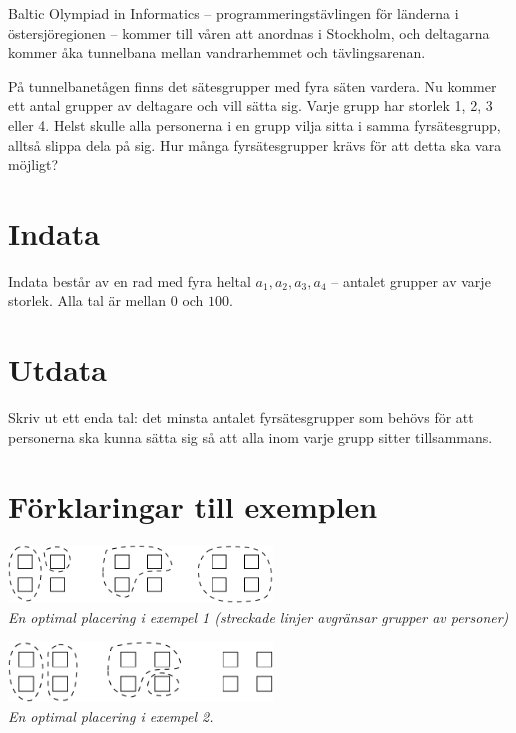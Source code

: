 
Baltic Olympiad in Informatics -- programmeringstävlingen för länderna i
östersjöregionen -- kommer till våren att anordnas i Stockholm, och
deltagarna kommer åka tunnelbana mellan vandrarhemmet och tävlingsarenan.

På tunnelbanetågen finns det sätesgrupper med fyra säten vardera. Nu
kommer ett antal grupper av deltagare och vill sätta sig. Varje grupp
har storlek 1, 2, 3 eller 4. Helst skulle alla personerna i en grupp
vilja sitta i samma fyrsätesgrupp, alltså slippa dela på sig. Hur många fyrsätesgrupper krävs för att detta ska vara möjligt?

\section*{Indata}

Indata består av en rad med fyra heltal $a_1, a_2, a_3, a_4$ -- antalet grupper av varje storlek. Alla tal är mellan $0$ och $100$.

\section*{Utdata}

Skriv ut ett enda tal: det minsta antalet fyrsätesgrupper som behövs för att
personerna ska kunna sätta sig så att alla inom varje grupp sitter tillsammans.

\section*{Förklaringar till exemplen}

\includegraphics[width=7cm]{tunnelbana1.pdf}\\
{\em En optimal placering i exempel 1 (streckade linjer avgränsar grupper av personer)}
\vspace{1cm}

\includegraphics[width=7cm]{tunnelbana2.pdf}\\
{\em En optimal placering i exempel 2.}
\vspace{1cm}

